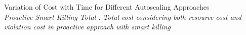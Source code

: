  Variation of Cost with Time for Different Autoscaling Approaches\\
\textit{Proactive Smart Killing Total : Total cost considering both resource cost and violation cost in proactive approach with smart killing}